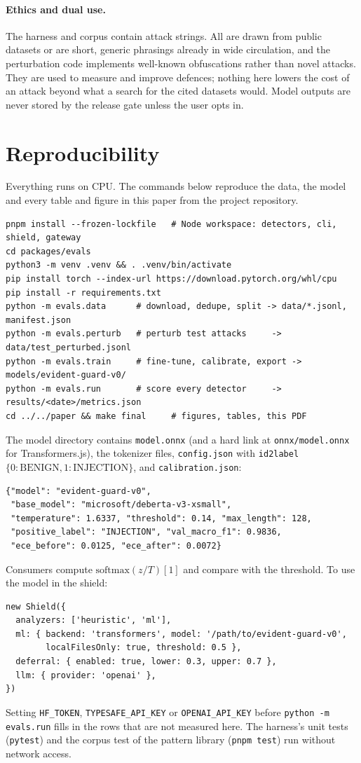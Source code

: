 \documentclass[10pt,a4paper]{article}
\begin{document}
\paragraph{Ethics and dual use.} The harness and corpus contain attack strings. All are drawn from public datasets or are short, generic phrasings already in wide circulation, and the perturbation code implements well-known obfuscations rather than novel attacks. They are used to measure and improve defences; nothing here lowers the cost of an attack beyond what a search for the cited datasets would. Model outputs are never stored by the release gate unless the user opts in.

\section{Reproducibility}
\label{sec:repro}

Everything runs on CPU. The commands below reproduce the data, the model and every table and figure in this paper from the project repository.

\begin{verbatim}
pnpm install --frozen-lockfile   # Node workspace: detectors, cli, shield, gateway
cd packages/evals
python3 -m venv .venv && . .venv/bin/activate
pip install torch --index-url https://download.pytorch.org/whl/cpu
pip install -r requirements.txt
python -m evals.data      # download, dedupe, split -> data/*.jsonl, manifest.json
python -m evals.perturb   # perturb test attacks     -> data/test_perturbed.jsonl
python -m evals.train     # fine-tune, calibrate, export -> models/evident-guard-v0/
python -m evals.run       # score every detector     -> results/<date>/metrics.json
cd ../../paper && make final     # figures, tables, this PDF
\end{verbatim}

\noindent The model directory contains \texttt{model.onnx} (and a hard link at \texttt{onnx/model.onnx} for Transformers.js), the tokenizer files, \texttt{config.json} with \texttt{id2label} $\{0\colon \text{BENIGN}, 1\colon \text{INJECTION}\}$, and \texttt{calibration.json}:
\begin{verbatim}
{"model": "evident-guard-v0",
 "base_model": "microsoft/deberta-v3-xsmall",
 "temperature": 1.6337, "threshold": 0.14, "max_length": 128,
 "positive_label": "INJECTION", "val_macro_f1": 0.9836,
 "ece_before": 0.0125, "ece_after": 0.0072}
\end{verbatim}
Consumers compute $\mathrm{softmax}(z/T)[1]$ and compare with the threshold. To use the model in the shield:
\begin{verbatim}
new Shield({
  analyzers: ['heuristic', 'ml'],
  ml: { backend: 'transformers', model: '/path/to/evident-guard-v0',
        localFilesOnly: true, threshold: 0.5 },
  deferral: { enabled: true, lower: 0.3, upper: 0.7 },
  llm: { provider: 'openai' },
})
\end{verbatim}
Setting \texttt{HF\_TOKEN}, \texttt{TYPESAFE\_API\_KEY} or \texttt{OPENAI\_API\_KEY} before \texttt{python -m evals.run} fills in the rows that are not measured here. The harness's unit tests (\texttt{pytest}) and the corpus test of the pattern library (\texttt{pnpm test}) run without network access.

\printbibliography
\end{document}
